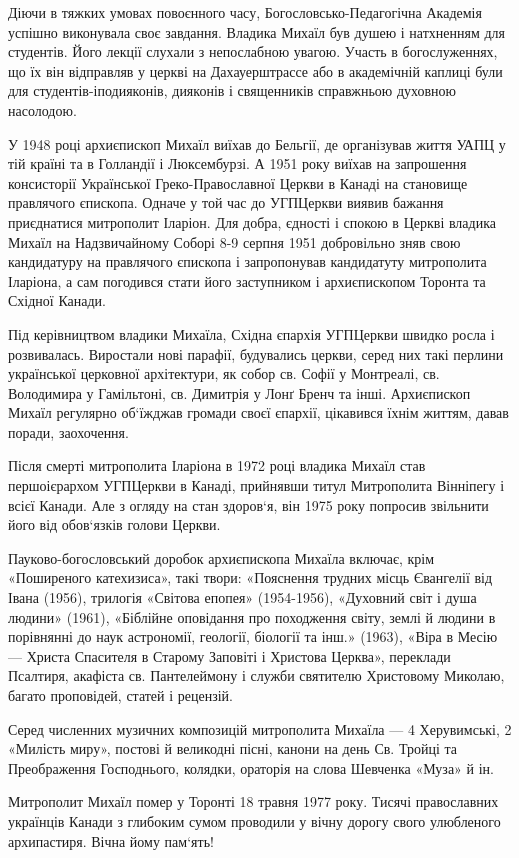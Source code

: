 \documentclass[main.tex]{subfiles}
\begin{document}
Діючи в тяжких умовах повоєнного часу, Богословсько-Педагогічна Академія успішно виконувала своє завдання. Владика Михаїл був душею і натхненням для студентів. Його лекції слухали з непослабною увагою. Участь в богослуженнях, що їх він відправляв у церкві на Дахауерштрассе або в академічній каплиці були для студентів-іподияконів, дияконів і священників справжньою духовною насолодою.

У 1948 році архиєпископ Михаїл виїхав до Бельгії, де організував життя УАПЦ у тій країні та в Голландії і Люксембурзі. А 1951 року виїхав на запрошення консисторії Української Греко-Православної Церкви в Канаді на становище правлячого єпископа. Одначе у той час до УГПЦеркви виявив бажання приєднатися митрополит Іларіон. Для добра, єдності і спокою в Церкві владика Михаїл на Надзвичайному Соборі 8-9 серпня 1951 добровільно зняв свою кандидатуру на правлячого єпископа і запропонував кандидатуту митрополита Іларіона, а сам погодився стати його заступником і архиєпископом Торонта та Східної Канади.

Під керівництвом владики Михаїла, Східна єпархія УГПЦеркви швидко росла і розвивалась. Виростали нові парафії, будувались церкви, серед них такі перлини української церковної архітектури, як собор св. Софії у Монтреалі, св. Володимира у Гамільтоні, св. Димитрія у Лонґ Бренч та інші. Архиєпископ Михаїл регулярно об`їжджав громади своєї єпархії, цікавився їхнім життям, давав поради, заохочення.

Після смерті митрополита Іларіона в 1972 році владика Михаїл став першоієрархом УГПЦеркви в Канаді, прийнявши титул Митрополита Вінніпегу і всієї Канади. Але з огляду на стан здоров`я, він 1975 року попросив звільнити його від обов`язків голови Церкви.

Пауково-богословський доробок архиєпископа Михаїла включає, крім «Поширеного катехизиса», такі твори: «Пояснення трудних місць Євангелії від Івана (1956), трилогія «Світова епопея» (1954-1956), «Духовний світ і душа людини» (1961), «Біблійне оповідання про походження світу, землі й людини в порівнянні до наук астрономії, геології, біології та інш.» (1963), «Віра в Месію — Христа Спасителя в Старому Заповіті і Христова Церква», переклади Псалтиря, акафіста св. Пантелеймону і служби святителю Христовому Миколаю, багато проповідей, статей і рецензій.

Серед численних музичних композицій митрополита Михаїла — 4 Херувимські, 2 «Милість миру», постові й великодні пісні, канони на день Св. Тройці та Преображення Господнього, колядки, ораторія на слова Шевченка «Муза» й ін.

Митрополит Михаїл помер у Торонті 18 травня 1977 року. Тисячі православних українців Канади з глибоким сумом проводили у вічну дорогу свого улюбленого архипастиря. Вічна йому пам`ять!
\end{document}

